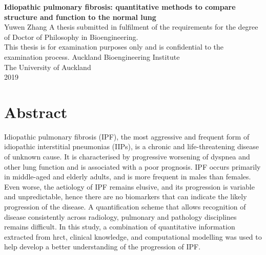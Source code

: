 \documentclass[a4paper, 12pt]{book}
\begin{document}
\frontmatter

\begin{titlepage}
  \begin{center}
    \vfill
    {\Large \textbf{Idiopathic pulmonary fibrosis: quantitative methods to compare structure and function to the normal lung}} %
    \\[6cm]
    Yuwen Zhang
    \vfill
    \normalsize A thesis submitted in fulfilment of the requirements for the degree of Doctor of Philosophy in Bioengineering. \\[1cm]
    This thesis is for examination purposes only and is confidential to the examination process.
    \vfill
    Auckland Bioengineering Institute
    \\[0.8cm] The University of Auckland
    \\[0.8cm] 2019
  \end{center}
\end{titlepage}

\cleardoublepage
\chapter*{Abstract}
Idiopathic pulmonary fibrosis (IPF), the most aggressive and frequent form of idiopathic interstitial pneumonias (IIPs), is a chronic and life-threatening disease of unknown cause. It is characterised by progressive worsening of dyspnea and other lung function and is associated with a poor prognosis. IPF occurs primarily in middle-aged and elderly adults, and is more frequent in males than females. Even worse, the aetiology of IPF remains elusive, and its progression is variable and unpredictable, hence there are no biomarkers that can indicate the likely progression of the disease. A quantification scheme that allows recognition of disease consistently across radiology, pulmonary and pathology disciplines remains difficult. In this study, a combination of quantitative information extracted from \gls{hrct}, clinical knowledge, and computational modelling was used to help develop a better understanding of the progression of IPF.
\end{document}
